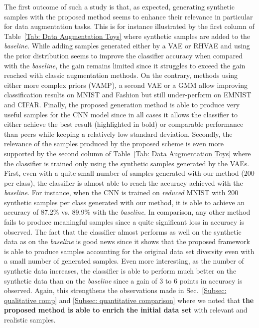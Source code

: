 \documentclass[10pt,journal,compsoc]{IEEEtran}
\begin{document}
The first outcome of such a study is that, as expected, generating synthetic samples with the proposed method seems to enhance their relevance in particular for data augmentation tasks. This is for instance illustrated by the first column of Table~\ref{Tab: Data Augmentation Toys} where synthetic samples are added to the \emph{baseline}. While adding samples generated either by a VAE or RHVAE and using the prior distribution seems to improve the classifier accuracy when compared with the \emph{baseline}, the gain remains limited since it struggles to exceed the gain reached with classic augmentation methods. On the contrary, methods using either more complex priors (VAMP), a second VAE or a GMM allow improving classification results on MNIST and Fashion but still under-perform on EMNIST and CIFAR. Finally, the proposed generation method is able to produce very useful samples for the CNN model since in all cases it allows the classifier to either achieve the best result (highlighted in bold) or comparable performance than peers while keeping a relatively low standard deviation. Secondly, the relevance of the samples produced by the proposed scheme is even more supported by the second column of Table~\ref{Tab: Data Augmentation Toys} where the classifier is trained only using the synthetic samples generated by the VAEs. First, even with a quite small number of samples generated with our method (200 per class), the classifier is almost able to reach the accuracy achieved with the \emph{baseline}. For instance, when the CNN is trained on \emph{reduced} MNIST with 200 synthetic samples per class generated with our method, it is able to achieve an accuracy of 87.2\% vs. 89.9\% with the \emph{baseline}. In comparison, any other method fails to produce meaningful samples since a quite significant loss in accuracy is observed. The fact that the classifier almost performs as well on the synthetic data as on the \emph{baseline} is good news since it shows that the proposed framework is able to produce samples accounting for the original data set diversity even with a small number of generated samples. Even more interesting, as the number of synthetic data increases, the classifier is able to perform much better on the synthetic data than on the \emph{baseline} since a gain of 3 to 6 points in accuracy is observed. Again, this strengthens the observations made in Sec.~\ref{Subsec: qualitative comp} and \ref{Subsec: quantitative comparison} where we noted that \textbf{the proposed method is able to enrich the initial data set} with relevant and realistic samples.
\end{document}
